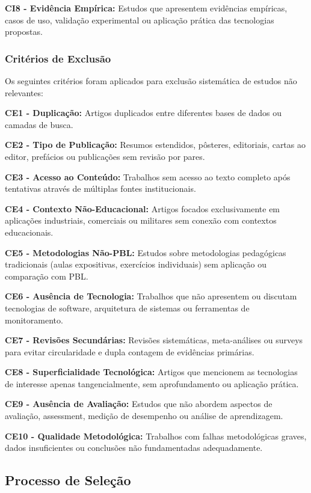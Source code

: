 \documentclass[english, spanish, brazilian]{RBIEarticle} %
\begin{document}
\textbf{CI8 - Evidência Empírica:} Estudos que apresentem evidências empíricas, casos de uso, validação experimental ou aplicação prática das tecnologias propostas.

\subsubsection{Critérios de Exclusão}

Os seguintes critérios foram aplicados para exclusão sistemática de estudos não relevantes:

\textbf{CE1 - Duplicação:} Artigos duplicados entre diferentes bases de dados ou camadas de busca.

\textbf{CE2 - Tipo de Publicação:} Resumos estendidos, pôsteres, editoriais, cartas ao editor, prefácios ou publicações sem revisão por pares.

\textbf{CE3 - Acesso ao Conteúdo:} Trabalhos sem acesso ao texto completo após tentativas através de múltiplas fontes institucionais.

\textbf{CE4 - Contexto Não-Educacional:} Artigos focados exclusivamente em aplicações industriais, comerciais ou militares sem conexão com contextos educacionais.

\textbf{CE5 - Metodologias Não-PBL:} Estudos sobre metodologias pedagógicas tradicionais (aulas expositivas, exercícios individuais) sem aplicação ou comparação com PBL.

\textbf{CE6 - Ausência de Tecnologia:} Trabalhos que não apresentem ou discutam tecnologias de software, arquitetura de sistemas ou ferramentas de monitoramento.

\textbf{CE7 - Revisões Secundárias:} Revisões sistemáticas, meta-análises ou surveys para evitar circularidade e dupla contagem de evidências primárias.

\textbf{CE8 - Superficialidade Tecnológica:} Artigos que mencionem as tecnologias de interesse apenas tangencialmente, sem aprofundamento ou aplicação prática.

\textbf{CE9 - Ausência de Avaliação:} Estudos que não abordem aspectos de avaliação, assessment, medição de desempenho ou análise de aprendizagem.

\textbf{CE10 - Qualidade Metodológica:} Trabalhos com falhas metodológicas graves, dados insuficientes ou conclusões não fundamentadas adequadamente.

\subsection{Processo de Seleção}
\end{document}
